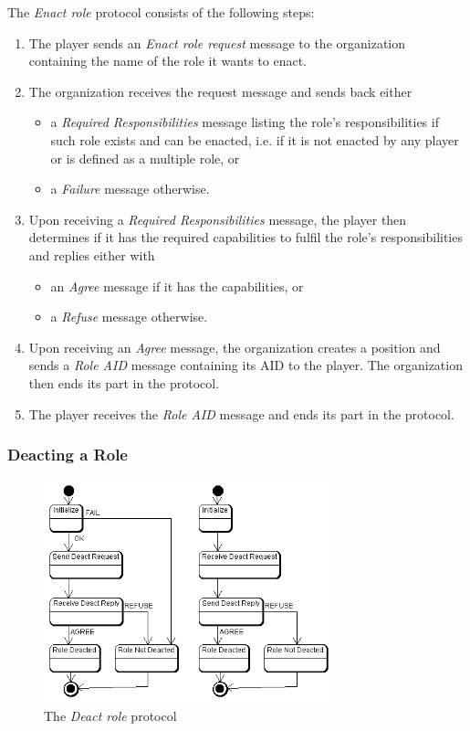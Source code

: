 The \textit{Enact role} protocol consists of the following steps:
\begin{enumerate}
	\item The player sends an \textit{Enact role request} message to the organization containing the name of the role it wants to enact.
	\item The organization receives the request message and sends back either
	\begin{itemize}
		\item a \textit{Required Responsibilities} message listing the role's responsibilities if such role exists and can be enacted, i.e. if it is not enacted by any player or is defined as a multiple role, or
		\item a \textit{Failure} message otherwise. 
	\end{itemize}
	\item Upon receiving a \textit{Required Responsibilities} message, the player then determines if it has the required capabilities to fulfil the role's responsibilities and replies either with
	\begin{itemize}
		\item an \textit{Agree} message if it has the capabilities, or
		\item a \textit{Refuse} message otherwise.
	\end{itemize}
	\item Upon receiving an \textit{Agree} message, the organization creates a position and sends a \textit{Role AID} message containing its AID to the player.
	The organization then ends its part in the protocol.
	\item The player receives the \textit{Role AID} message and ends its part in the protocol.
\end{enumerate}


\subsubsection{Deacting a Role}

\begin{figure}[ht]
	\centering
	\includegraphics[width=0.75\textwidth]{images/thespian/deact-role-protocol.png}
	\caption{The \textit{Deact role} protocol}
	\label{figure:thespian-deact-role-protocol}
\end{figure}

